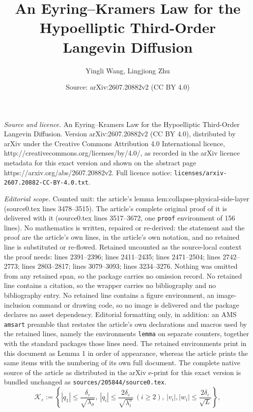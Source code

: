 \documentclass[10pt,a4paper]{amsart}
\title{An Eyring--Kramers Law for the Hypoelliptic Third-Order\\ Langevin Diffusion}
\author{Yingli Wang, Lingjiong Zhu}
\date{Source: arXiv:2607.20882v2 (CC BY 4.0)}
\newcommand{\eps}{\varepsilon}
\begin{document}
\maketitle

\noindent\emph{Source and licence.} An Eyring--Kramers Law for the Hypoelliptic Third-Order\\ Langevin Diffusion. Version arXiv:2607.20882v2 (CC BY 4.0), distributed by arXiv under the Creative Commons Attribution 4.0 International licence, http://creativecommons.org/licenses/by/4.0/, as recorded in the arXiv licence metadata for this exact version and shown on the abstract page https://arxiv.org/abs/2607.20882v2. Full licence notice: \texttt{licenses/arxiv-2607.20882-CC-BY-4.0.txt}.\par\smallskip

\noindent\textit{Editorial scope.} Counted unit: the article's lemma lem:collapse-physical-side-layer (source0.tex lines 3478--3515). The article's complete original proof of it is delivered with it (source0.tex lines 3517--3672, one \texttt{proof} environment of 156 lines). No mathematics is written, repaired or re-derived: the statement and the proof are the article's own lines, in the article's own notation, and no retained line is substituted or re-flowed.  Retained uncounted as the source-local context the proof needs: lines 2391--2396; lines 2411--2435; lines 2471--2504; lines 2742--2773; lines 2803--2817; lines 3079--3093; lines 3234--3276.  Nothing was omitted from any retained span, so the package carries no omission record.  No retained line contains a citation, so the wrapper carries no bibliography and no bibliography entry.  No retained line contains a figure environment, an image-inclusion command or drawing code, so no image is delivered and the package declares no asset dependency.  Editorial formatting only, in addition: an AMS \texttt{amsart} preamble that restates the article's own declarations and macros used by the retained lines, namely the environments \texttt{lemma} on separate counters, together with the standard packages those lines need.  The retained environments print in this document as Lemma 1 in order of appearance, whereas the article prints the same items with the numbering of its own full document.  The complete native source of the article as distributed in the arXiv e-print for this exact version is bundled unchanged as \texttt{sources/205844/source0.tex}.
\begin{equation}
\label{eq:logarithmic-saddle-box}
\mathcal K_\eps:=\left\{|q_1|\le\frac{\delta_\eps}{\sqrt{\lambda_\sigma}},\
|q_i|\le\frac{2\delta_\eps}{\sqrt{\lambda_i^\sigma}}\ (i\ge2),\
|v_i|,|w_i|\le\frac{2\delta_\eps}{\sqrt L}\right\},
\end{equation}
\end{document}

